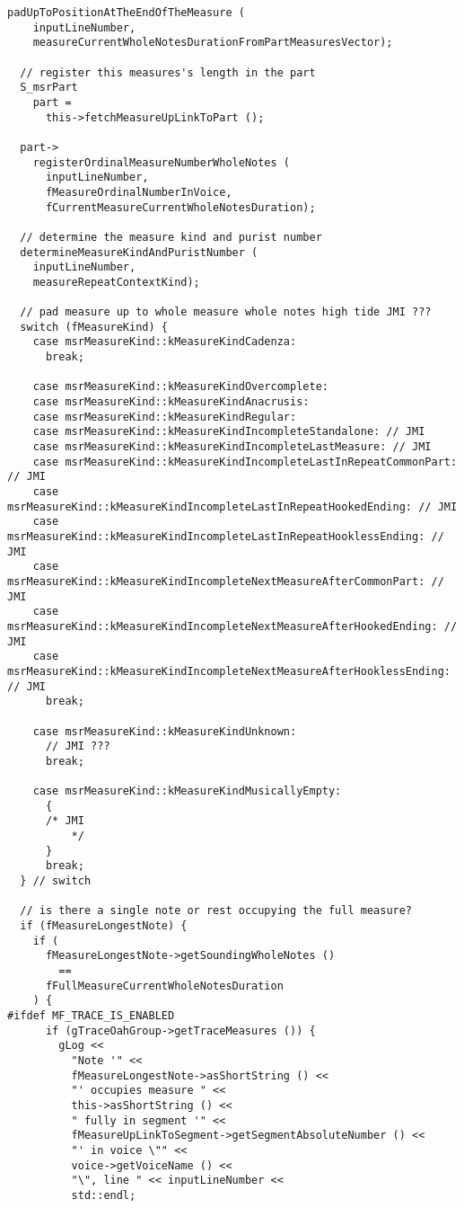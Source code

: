 \begin{lstlisting}[language=CPlusPlus]
  padUpToPositionAtTheEndOfTheMeasure (
    inputLineNumber,
    measureCurrentWholeNotesDurationFromPartMeasuresVector);

  // register this measures's length in the part
  S_msrPart
    part =
      this->fetchMeasureUpLinkToPart ();

  part->
    registerOrdinalMeasureNumberWholeNotes (
      inputLineNumber,
      fMeasureOrdinalNumberInVoice,
      fCurrentMeasureCurrentWholeNotesDuration);

  // determine the measure kind and purist number
  determineMeasureKindAndPuristNumber (
    inputLineNumber,
    measureRepeatContextKind);

  // pad measure up to whole measure whole notes high tide JMI ???
  switch (fMeasureKind) {
    case msrMeasureKind::kMeasureKindCadenza:
      break;

    case msrMeasureKind::kMeasureKindOvercomplete:
    case msrMeasureKind::kMeasureKindAnacrusis:
    case msrMeasureKind::kMeasureKindRegular:
    case msrMeasureKind::kMeasureKindIncompleteStandalone: // JMI
    case msrMeasureKind::kMeasureKindIncompleteLastMeasure: // JMI
    case msrMeasureKind::kMeasureKindIncompleteLastInRepeatCommonPart: // JMI
    case msrMeasureKind::kMeasureKindIncompleteLastInRepeatHookedEnding: // JMI
    case msrMeasureKind::kMeasureKindIncompleteLastInRepeatHooklessEnding: // JMI
    case msrMeasureKind::kMeasureKindIncompleteNextMeasureAfterCommonPart: // JMI
    case msrMeasureKind::kMeasureKindIncompleteNextMeasureAfterHookedEnding: // JMI
    case msrMeasureKind::kMeasureKindIncompleteNextMeasureAfterHooklessEnding: // JMI
      break;

    case msrMeasureKind::kMeasureKindUnknown:
      // JMI ???
      break;

    case msrMeasureKind::kMeasureKindMusicallyEmpty:
      {
      /* JMI
          */
      }
      break;
  } // switch

  // is there a single note or rest occupying the full measure?
  if (fMeasureLongestNote) {
    if (
      fMeasureLongestNote->getSoundingWholeNotes ()
        ==
      fFullMeasureCurrentWholeNotesDuration
    ) {
#ifdef MF_TRACE_IS_ENABLED
      if (gTraceOahGroup->getTraceMeasures ()) {
        gLog <<
          "Note '" <<
          fMeasureLongestNote->asShortString () <<
          "' occupies measure " <<
          this->asShortString () <<
          " fully in segment '" <<
          fMeasureUpLinkToSegment->getSegmentAbsoluteNumber () <<
          "' in voice \"" <<
          voice->getVoiceName () <<
          "\", line " << inputLineNumber <<
          std::endl;


\end{lstlisting}
